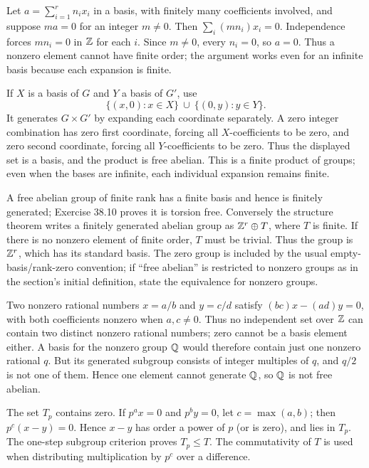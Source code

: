 Let $a=\sum_{i=1}^r n_ix_i$ in a basis, with finitely many coefficients involved, and suppose $ma=0$ for an integer $m\ne0$. Then $\sum_i(mn_i)x_i=0$.
Independence forces $mn_i=0$ in $\mathbb{Z}$ for each $i$. Since $m\ne0$, every $n_i=0$, so $a=0$. Thus a nonzero element cannot have finite order; the argument works even for an infinite basis because each expansion is finite.

If $X$ is a basis of $G$ and $Y$ a basis of $G'$, use
\[
\{(x,0):x\in X\}\ \cup\ \{(0,y):y\in Y\}.
\]
It generates $G\times G'$ by expanding each coordinate separately. A zero integer combination has zero first coordinate, forcing all $X$-coefficients to be zero, and zero second coordinate, forcing all $Y$-coefficients to be zero. Thus the displayed set is a basis, and the product is free abelian. This is a finite product of groups; even when the bases are infinite, each individual expansion remains finite.

A free abelian group of finite rank has a finite basis and hence is finitely generated; Exercise 38.10 proves it is torsion free.
Conversely the structure theorem writes a finitely generated abelian group as $\mathbb{Z}^r\oplus T$, where $T$ is finite. If there is no nonzero element of finite order, $T$ must be trivial. Thus the group is $\mathbb{Z}^r$, which has its standard basis.
The zero group is included by the usual empty-basis/rank-zero convention; if ``free abelian'' is restricted to nonzero groups as in the section's initial definition, state the equivalence for nonzero groups.

Two nonzero rational numbers $x=a/b$ and $y=c/d$ satisfy
$(bc)x-(ad)y=0$, with both coefficients nonzero when $a,c\ne0$. Thus no independent set over $\mathbb{Z}$ can contain two distinct nonzero rational numbers; zero cannot be a basis element either.
A basis for the nonzero group $\mathbb{Q}$ would therefore contain just one nonzero rational $q$. But its generated subgroup consists of integer multiples of $q$, and $q/2$ is not one of them. Hence one element cannot generate $\mathbb{Q}$, so $\mathbb{Q}$ is not free abelian.

The set $T_p$ contains zero. If $p^a x=0$ and $p^b y=0$, let $c=\max(a,b)$; then $p^c(x-y)=0$. Hence $x-y$ has order a power of $p$ (or is zero), and lies in $T_p$.
The one-step subgroup criterion proves $T_p\le T$. The commutativity of $T$ is used when distributing multiplication by $p^c$ over a difference.

